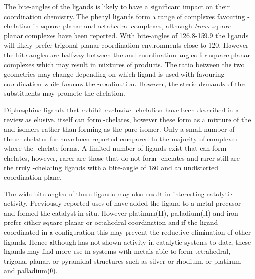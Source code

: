 {The bite-angles of the \tBuxantphos{} ligands is likely to have a significant impact on their coordination chemistry.  The phenyl ligands form a range of complexes favouring \cis-chelation in square-planar and octahedral complexes, although \emph{trans} square planar complexes have been reported\cite{Petocz2004}.  With bite-angles of 126.8-159.9\degrees{} the ligands will likely prefer trigonal planar coordination environments close to 120\degrees.  However the bite-angles are halfway between the \cis{} and \trans{} coordination angles for square planar complexes which may result in mixtures of products.  The ratio between the two geometries may change depending on which ligand is used with \tBusixantphos{} favouring \cis-coordination while \tBuxantphos{} favours the \trans-coodination.  However, the steric demands of the \tBu{} substituents may promote the \trans{} chelation.  

Diphosphine ligands that exhibit exclusive \trans-chelation have been described in a review as elusive.\cite{Freixa2008}  \PhXantphos{} itself can form \trans-chelates\cite{Petocz2004}, however these form as a mixture of the \cis and \trans isomers rather than forming as the pure \trans isomer.  Only a small number of these \trans-chelates for \Phxantphos{} have been reported compared to the majority of complexes where the \cis-chelate forms.  A limited number of ligands exist that can form \trans-chelates, however, rarer are those that do not form \cis-chelates and rarer still are the truly \trans-chelating ligands with a bite-angle of 180\degrees{} and an undistorted coordination plane. 

The wide bite-angles of these ligands may also result in interesting catalytic activity.  Previously reported uses of \tBuxantphos{} have added the ligand to a metal precusor and formed the catalyst in situ.  However platinum(II), palladium(II) and iron prefer either square-planar or octahedral coordination and if the \tBuxantphos{} ligand coordinated in a \trans{} configuration this may prevent the reductive elimination of other ligands.  Hence although \tBuxantphos{} has not shown activity in catalytic systems to date, these ligands may find more use in systems with metals able to form tetrahedral, trigonal planar, or pyramidal structures such as silver or rhodium, or platinum and palladium(0).


}
